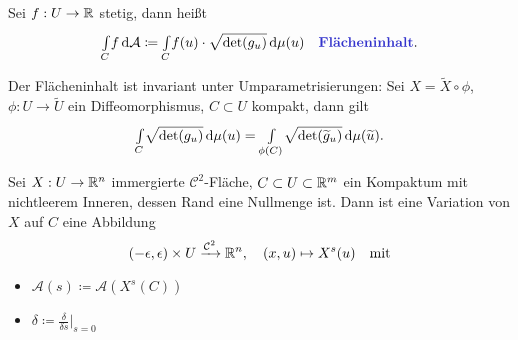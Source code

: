 \documentclass{cheat-sheet}
\newcommand{\A}{\mathcal{A}} %
\begin{document}



\begin{defn}
  Sei $f : U \to \mathbb{R}$ stetig, dann heißt
  \[ \Int{C}{}{f}{\A} \coloneqq \Int{C}{}{f(u) \cdot \sqrt{\det(g_u)}}{\mu (u)} \quad \text{\emph{Flächeninhalt}.} \]
\end{defn}

\begin{prop}
  Der Flächeninhalt ist invariant unter Umparametrisierungen: Sei $X = \widetilde{X} \circ \phi$, $\phi : U \to \widetilde{U}$ ein Diffeomorphismus, $C \subset U$ kompakt, dann gilt
  \[ {\textstyle \int\limits_{C}^{}} \sqrt{\det(g_u)} \,\mathrm{d} \mu (u) = {\textstyle \int\limits_{\phi(C)}^{}} \sqrt{\det(\widetilde{g}_u)} \,\mathrm{d} \mu (\widetilde{u}). \]
\end{prop}



\begin{defn}
  Sei $X : U \to \mathbb{R}^n$ immergierte $\mathcal{C}^2$-Fläche,
  $C \subset U \subset \mathbb{R}^m$ ein Kompaktum mit nichtleerem Inneren, dessen Rand eine Nullmenge ist.
  Dann ist eine Variation von $X$ auf $C$ eine Abbildung
  \[
    \left( -\epsilon, \epsilon \right) \times U \xrightarrow{\mathcal{C}^2} \mathbb{R}^n, \quad
    (x, u) \mapsto X^s(u) \quad \text{mit}
  \]
  \begin{itemize}
  \end{itemize}
\end{defn}

\begin{nota}
  \begin{multicols}{2}
    \begin{itemize}
      \item $\A(s) \coloneqq \A(X^s(C))$
      \item $\delta \coloneqq \tfrac{\delta}{\delta s}|_{s = 0}$
    \end{itemize}
  \end{multicols}
\end{nota}
\end{document}
